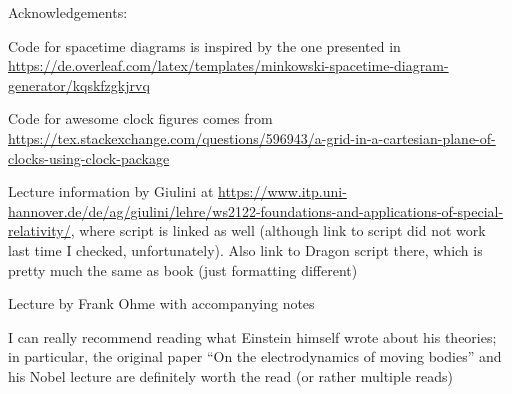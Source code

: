 




\makeindex





\pagestyle{plain.scrheadings}





\setcounter{page}{0}
\thispagestyle{empty}


\newpage


\begin{center}
Acknowledgements:

Code for spacetime diagrams is inspired by the one presented in \url{https://de.overleaf.com/latex/templates/minkowski-spacetime-diagram-generator/kqskfzgkjrvq}


Code for awesome clock figures comes from \url{https://tex.stackexchange.com/questions/596943/a-grid-in-a-cartesian-plane-of-clocks-using-clock-package}


Lecture information by Giulini at \url{https://www.itp.uni-hannover.de/de/ag/giulini/lehre/ws2122-foundations-and-applications-of-special-relativity/}, where script is linked as well (although link to script did not work last time I checked, unfortunately). Also link to Dragon script there, which is pretty much the same as book (just formatting different)

Lecture by Frank Ohme with accompanying notes


I can really recommend reading what Einstein himself wrote about his theories; in particular, the original paper \enquote{On the electrodynamics of moving bodies} and his Nobel lecture are definitely worth the read (or rather multiple reads)
\end{center}



\newpage



{
\hypersetup{linkcolor=black}
\tableofcontents
}

\newpage

{
\hypersetup{linkcolor=black}
\listoffigures
}

\newpage


\iffalse
{
\hypersetup{linkcolor=black}
\listoftables
}


